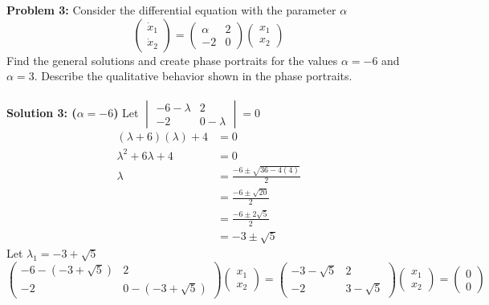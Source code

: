 \documentclass[12pt]{article}
\begin{document}
\noindent \textbf{Problem 3: }Consider the differential equation with the parameter $\alpha$ 
$$
\begin{pmatrix}
	\dot{x}_1 \\
	\dot{x}_2
\end{pmatrix} = 
\begin{pmatrix}
	\alpha & 2 \\
	-2 & 0
\end{pmatrix} 
\begin{pmatrix}
	x_1 \\
	x_2
\end{pmatrix}
$$
Find the general solutions and create phase portraits for the values $\alpha = -6$ and $\alpha = 3$. Describe the qualitative behavior shown in the phase portraits. 
\\ \\
\noindent \textbf{Solution 3: ($\alpha = -6$) } Let 
$		
\begin{vmatrix}
	-6 - \lambda  & 2 \\
	-2 & 0 - \lambda
\end{vmatrix} = 0
$ 
\\ 
\begin{align*}
	(\lambda + 6)(\lambda) + 4 &= 0 \\
	\lambda^2 + 6\lambda + 4 &= 0 \\
	\lambda &= \frac{-6 \pm \sqrt{36 - 4(4)}}{2} \\
	&= \frac{-6 \pm \sqrt{20}}{2} \\
	&= \frac{-6 \pm 2\sqrt{5}}{2} \\
	&= -3 \pm \sqrt{5}
\end{align*}
Let $\lambda_1 = -3 + \sqrt{5}$
$$
\begin{pmatrix}
	-6 - (-3 + \sqrt{5}) & 2 \\
	-2 & 0 - (-3 + \sqrt{5})
\end{pmatrix}
\begin{pmatrix}
	x_1 \\
	x_2
\end{pmatrix} = 
\begin{pmatrix}
	-3 - \sqrt{5} & 2 \\
	-2 & 3 - \sqrt{5}
\end{pmatrix}
\begin{pmatrix}
	x_1 \\
	x_2
\end{pmatrix} = 
\begin{pmatrix}
	0 \\
	0
\end{pmatrix}
$$
\end{document}
